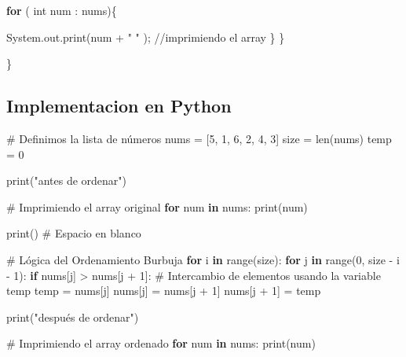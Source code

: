 \documentclass[
  spanish,
  letterpaper,
  DIV=11,
  numbers=noendperiod]{scrreprt}
\newenvironment{Shaded}{\begin{snugshade}}{\end{snugshade}}
\newcommand{\BuiltInTok}[1]{\textcolor[rgb]{0.00,0.23,0.31}{#1}}
\newcommand{\CommentTok}[1]{\textcolor[rgb]{0.37,0.37,0.37}{#1}}
\newcommand{\ControlFlowTok}[1]{\textcolor[rgb]{0.00,0.23,0.31}{\textbf{#1}}}
\newcommand{\DataTypeTok}[1]{\textcolor[rgb]{0.68,0.00,0.00}{#1}}
\newcommand{\DecValTok}[1]{\textcolor[rgb]{0.68,0.00,0.00}{#1}}
\newcommand{\FunctionTok}[1]{\textcolor[rgb]{0.28,0.35,0.67}{#1}}
\newcommand{\KeywordTok}[1]{\textcolor[rgb]{0.00,0.23,0.31}{\textbf{#1}}}
\newcommand{\NormalTok}[1]{\textcolor[rgb]{0.00,0.23,0.31}{#1}}
\newcommand{\OperatorTok}[1]{\textcolor[rgb]{0.37,0.37,0.37}{#1}}
\newcommand{\StringTok}[1]{\textcolor[rgb]{0.13,0.47,0.30}{#1}}
\begin{document}
\begin{Shaded}
\begin{Highlighting}[]
     \ControlFlowTok{for} \OperatorTok{(} \DataTypeTok{int}\NormalTok{ num }\OperatorTok{:}\NormalTok{ nums}\OperatorTok{)\{}                              
       
          \BuiltInTok{System}\OperatorTok{.}\FunctionTok{out}\OperatorTok{.}\FunctionTok{print}\OperatorTok{(}\NormalTok{num }\OperatorTok{+} \StringTok{" "} \OperatorTok{);} \CommentTok{//imprimiendo el array}
      \OperatorTok{\}} 
  \OperatorTok{\}} 

\OperatorTok{\}}
\end{Highlighting}
\end{Shaded}

\subsection{Implementacion en Python}\label{implementacion-en-python}

\begin{Shaded}
\begin{Highlighting}[]
\CommentTok{\# Definimos la lista de números}
\NormalTok{nums }\OperatorTok{=}\NormalTok{ [}\DecValTok{5}\NormalTok{, }\DecValTok{1}\NormalTok{, }\DecValTok{6}\NormalTok{, }\DecValTok{2}\NormalTok{, }\DecValTok{4}\NormalTok{, }\DecValTok{3}\NormalTok{]}
\NormalTok{size }\OperatorTok{=} \BuiltInTok{len}\NormalTok{(nums)}
\NormalTok{temp }\OperatorTok{=} \DecValTok{0}

\BuiltInTok{print}\NormalTok{(}\StringTok{"antes de ordenar"}\NormalTok{)}

\CommentTok{\# Imprimiendo el array original}
\ControlFlowTok{for}\NormalTok{ num }\KeywordTok{in}\NormalTok{ nums:}
    \BuiltInTok{print}\NormalTok{(num)}

\BuiltInTok{print}\NormalTok{() }\CommentTok{\# Espacio en blanco}

\CommentTok{\# Lógica del Ordenamiento Burbuja}
\ControlFlowTok{for}\NormalTok{ i }\KeywordTok{in} \BuiltInTok{range}\NormalTok{(size):}
    \ControlFlowTok{for}\NormalTok{ j }\KeywordTok{in} \BuiltInTok{range}\NormalTok{(}\DecValTok{0}\NormalTok{, size }\OperatorTok{{-}}\NormalTok{ i }\OperatorTok{{-}} \DecValTok{1}\NormalTok{):}
        \ControlFlowTok{if}\NormalTok{ nums[j] }\OperatorTok{\textgreater{}}\NormalTok{ nums[j }\OperatorTok{+} \DecValTok{1}\NormalTok{]:}
            \CommentTok{\# Intercambio de elementos usando la variable temp}
\NormalTok{            temp }\OperatorTok{=}\NormalTok{ nums[j]}
\NormalTok{            nums[j] }\OperatorTok{=}\NormalTok{ nums[j }\OperatorTok{+} \DecValTok{1}\NormalTok{]}
\NormalTok{            nums[j }\OperatorTok{+} \DecValTok{1}\NormalTok{] }\OperatorTok{=}\NormalTok{ temp}

\BuiltInTok{print}\NormalTok{(}\StringTok{"después de ordenar"}\NormalTok{)}

\CommentTok{\# Imprimiendo el array ordenado}
\ControlFlowTok{for}\NormalTok{ num }\KeywordTok{in}\NormalTok{ nums:}
    \BuiltInTok{print}\NormalTok{(num)}
\end{Highlighting}
\end{Shaded}
\end{document}
